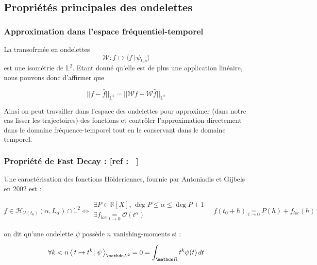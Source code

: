 \subsection{Propriétés principales des ondelettes}

\smallskip


\subsubsection{Approximation dans l'espace fréquentiel-temporel}

La transofrmée en ondelettes
\begin{equation*}
	\mathcal W : f \mapsto \langle f \, | \, \psi_{t,s} \rangle
\end{equation*}
est une isométrie de $\mathds L^2$. Etant donné qu'elle est de plus une application linéaire, nous pouvons donc d'affirmer que

\begin{equation*}
	\boxed{|| f - \hat f ||_{\mathds L^2} = || \mathcal W f - \mathcal W \hat f ||_{\mathds L^2}}
\end{equation*}

Ainsi on peut travailler dans l'espace des ondelettes pour approximer (dans notre cas lisser les trajectoires) des fonctions et contrôler l'approximation directement dans le domaine fréquence-temporel tout en le conservant dans le domaine temporel.

\subsubsection{Propriété de Fast Decay : [ref : ~\cite{mallat-wavelet-course-ens-wavelet-zoom}]}

Une caractérisation des fonctions Hölderiennes, fournie par Antoniadis et Gijbels en 2002 \citationrequise est :

\begin{equation*}
	f \in \mathcal H_{\mathcal V(t_0)}(\alpha, L_\alpha) \cap \mathds L^2 \iff
	\begin{array}{l}
		\exists P \in \mathds R[X], \, \deg P \leq \alpha \leq \deg P + 1
		\\
		\exists f_{loc} \underset{t \rightarrow 0}{=} \mathcal O(t^\alpha)
	\end{array}
	\quad f(t_0 + h) \underset{t \rightarrow 0}{=} P(h) + f_{loc}(h)
\end{equation*}

\begin{definition}
	on dit qu'une ondelette $\psi$ possède $n$ vanishing-moments si :

	\begin{equation*}
		\forall k < n \prodscalselon{t \mapsto t^k}{\psi}{\mathds L^2} = 0 = \int_{\mathds R} t^k \psi(t) \, dt
	\end{equation*}

\end{definition}

